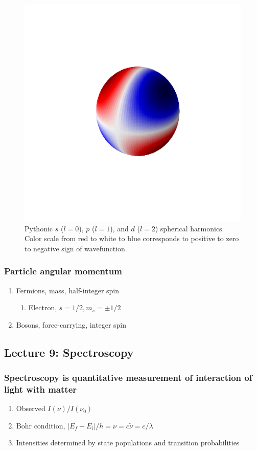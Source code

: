 \documentclass[11pt]{article}
\begin{document}
\begin{figure}
\includegraphics[scale=0.4]{./Images/d.png}
\caption{Pythonic $s$ ($l = 0$), $p$ ($l=1$), and $d$ ($l=2$) spherical harmonics. Color scale from red to white to blue corresponds to positive to zero to negative sign of wavefunction.}
\end{figure}

\subsubsection{Particle angular momentum}
\label{sec:orgf0afac0}
\begin{enumerate}
\item Fermions, mass, half-integer spin
\begin{enumerate}
\item Electron, \(s=1/2, m_s=\pm 1/2\)
\end{enumerate}
\item Bosons, force-carrying, integer spin
\end{enumerate}
\subsection{Lecture 9: Spectroscopy}
\label{sec:orgc2bb906}
\subsubsection{Spectroscopy is quantitative measurement of interaction of light with matter}
\label{sec:org7fa3a6f}
\begin{enumerate}
\item Observed \(I(\nu)/I(\nu_0)\)
\item Bohr condition, \(|E_f-E_i|/h=\nu =c\tilde{\nu}=c/\lambda\)
\item Intensities determined by state populations and transition probabilities
\end{enumerate}
\end{document}
